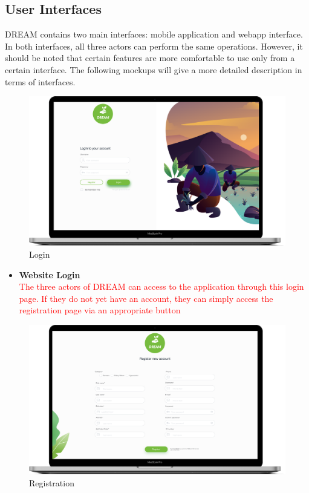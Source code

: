 \subsection{User Interfaces}
DREAM contains two main interfaces: mobile application and webapp interface.
In both interfaces, all three actors can perform the same operations.
However, it should be noted that certain features are more comfortable to use only from a certain interface.
The following mockups will give a more detailed description in terms of interfaces.

\begin{figure}[H]
  \includegraphics[width=140mm,scale=0.9]{./Images//Mocks/WebApp/Login.png}
  \caption{Login}
\end{figure}

\begin{itemize}
    \item \textbf{Website Login}\\ 
    \textcolor{red}{The three actors of DREAM can access to the application through this login page. If they do not yet have an account, they can simply access the registration page via an appropriate button}
\end{itemize}


\begin{figure}[H]
  \includegraphics[width=140mm,scale=0.9]{./Images//Mocks/WebApp/Registration.png}
  \caption{Registration}
\end{figure}

